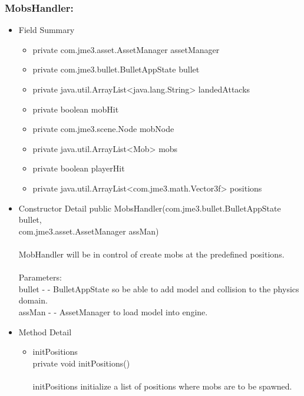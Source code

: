 \documentclass[letterpaper]{article}
\begin{document}
				\vspace{0.2in}
				\subsubsection*{MobsHandler:}
				\vspace{0.1in}
					\begin{itemize}
						\item	Field Summary
								\begin{itemize}
									\item	private com.jme3.asset.AssetManager	assetManager 
									\item	private com.jme3.bullet.BulletAppState	bullet 
									\item	private java.util.ArrayList<java.lang.String>	landedAttacks 
									\item	private boolean	mobHit 
									\item	private com.jme3.scene.Node	mobNode 
									\item	private java.util.ArrayList<Mob>	mobs 
									\item	private boolean	playerHit 
									\item	private java.util.ArrayList<com.jme3.math.Vector3f>	positions 
								\end{itemize}
						\item	Constructor Detail
								public MobsHandler(com.jme3.bullet.BulletAppState bullet, \\
          com.jme3.asset.AssetManager assMan) \\ \\
								MobHandler will be in control of create mobs at the predefined positions. \\ \\
								Parameters: \\
								bullet - - BulletAppState so be able to add model and collision to the physics domain. \\
								assMan - - AssetManager to load model into engine.
						\item	Method Detail
								\begin{itemize}
									\item	initPositions \\
											private void initPositions() \\ \\
											initPositions initialize a list of positions where mobs are to be spawned.

\end{itemize}
\end{itemize}
\end{document}
